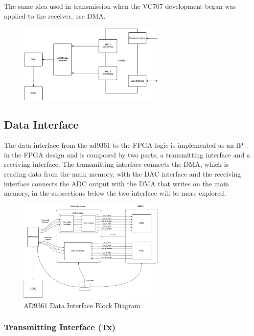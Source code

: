 The same idea used in transmission when the VC707 development began was applied
to the receiver, use DMA.

\begin{figure}[htbp]
    \centering
    \includegraphics[width=0.65\textwidth]{./figures/adc_dma}
    \caption{
    \label{fig:ad9361rxdma}}
\end{figure}


\subsection{Data Interface}

The data interface from the ad9361 to the FPGA logic is implemented as an IP in
the FPGA design and is composed by two parts, a transmitting interface and a
receiving interface. The transmitting interface connects the DMA, which is
reading data from the main memory, with the DAC interface and the receiving
interface connects the ADC output with the DMA that writes on the main memory,
in the subsections below the two interface will be more explored.

\begin{figure}[htbp]
    \centering
    \includegraphics[width=0.65\textwidth]{./figures/data_if}
    \caption{ AD9361 Data Interface Block Diagram
    \label{fig:databd}}
\end{figure}

\subsubsection{Transmitting Interface (Tx)}

